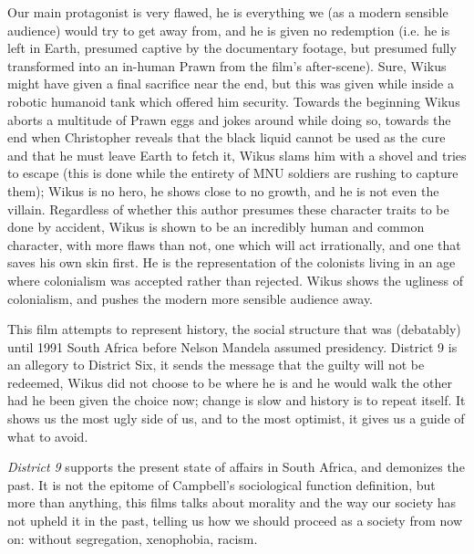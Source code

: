 \documentclass[10pt, letterpaper]{article}
\theoremstyle{definition}
\begin{document}
	Our main protagonist is very flawed, he is everything we (as a modern sensible audience) would try to get away from, and he is given no redemption (i.e. he is left in Earth, presumed captive by the documentary footage, but presumed fully transformed into an in-human Prawn from the film's after-scene). Sure, Wikus might have given a final sacrifice near the end, but this was given while inside a robotic humanoid tank which offered him security. Towards the beginning Wikus aborts a multitude of Prawn eggs and jokes around while doing so, towards the end when Christopher reveals that the black liquid cannot be used as the cure and that he must leave Earth to fetch it, Wikus slams him with a shovel and tries to escape (this is done while the entirety of MNU soldiers are rushing to capture them); Wikus is no hero, he shows close to no growth, and he is not even the villain. Regardless of whether this author presumes these character traits to be done by accident, Wikus is shown to be an incredibly human and common character, with more flaws than not, one which will act irrationally, and one that saves his own skin first. He is the representation of the colonists living in an age where colonialism was accepted rather than rejected. Wikus shows the ugliness of colonialism, and pushes the modern more sensible audience away.
	
	This film attempts to represent history, the social structure that was (debatably) until 1991 South Africa before Nelson Mandela assumed presidency. District 9 is an allegory to District Six, it sends the message that the guilty will not be redeemed, Wikus did not choose to be where he is and he would walk the other had he been given the choice now; change is slow and history is to repeat itself. It shows us the most ugly side of us, and to the most optimist, it gives us a guide of what to avoid.
	
	\emph{District 9} supports the present state of affairs in South Africa, and demonizes the past. It is not the epitome of Campbell’s sociological function definition, but more than anything, this films talks about morality and the way our society has not upheld it in the past, telling us how we should proceed as a society from now on: without segregation, xenophobia, racism.
	
	\clearpage


	\nocite{release_poster}
	\printbibliography

	\tableofcontents
\end{document}

